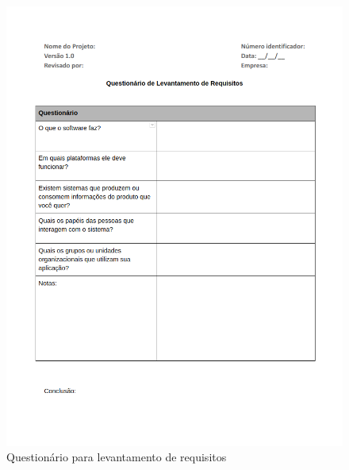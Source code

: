 \documentclass[	DIV=calc,%
							paper=a4,%
							fontsize=12pt,%
							onecolumn]{scrartcl}	 					%
\begin{document}
\begin{figure}
	\centering
	\includegraphics[width=\textwidth]{1.png}
	\caption{Questionário para levantamento de requisitos}
	\label{Figura 1}
\end{figure}
\end{document}
